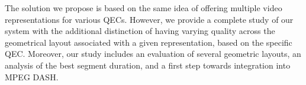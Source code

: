  The solution we propose is based on the same
idea of offering multiple video representations for various \acp{QEC}.
However, we provide a complete study of our system with the additional
distinction of having varying quality across the geometrical layout
associated with a given representation, based on the specific
\ac{QEC}. Moreover, our study includes an evaluation of several
geometric layouts, an analysis of the best segment duration,  and a first step towards integration into MPEG \ac{DASH}.
